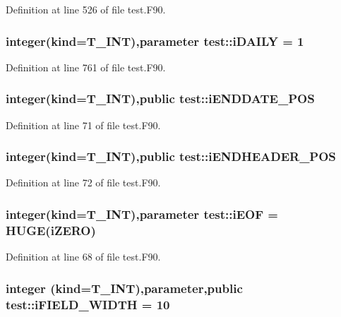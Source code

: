 Definition at line 526 of file test.F90.

\hypertarget{namespacetest_a48081398f90bec0222d878b534da1320}{
\subsubsection[{iDAILY}]{\setlength{\rightskip}{0pt plus 5cm}integer(kind={\bf T\_\-INT}),parameter {\bf test::iDAILY} = 1}}
\label{namespacetest_a48081398f90bec0222d878b534da1320}


Definition at line 761 of file test.F90.

\hypertarget{namespacetest_af29dc757927589439e32db648cb927b9}{
\subsubsection[{iENDDATE\_\-POS}]{\setlength{\rightskip}{0pt plus 5cm}integer(kind={\bf T\_\-INT}),public {\bf test::iENDDATE\_\-POS}}}
\label{namespacetest_af29dc757927589439e32db648cb927b9}


Definition at line 71 of file test.F90.

\hypertarget{namespacetest_ae27eee462dde556ad327a954598ee9de}{
\subsubsection[{iENDHEADER\_\-POS}]{\setlength{\rightskip}{0pt plus 5cm}integer(kind={\bf T\_\-INT}),public {\bf test::iENDHEADER\_\-POS}}}
\label{namespacetest_ae27eee462dde556ad327a954598ee9de}


Definition at line 72 of file test.F90.

\hypertarget{namespacetest_a3d9d5da4779988c8ab638ff80ee1d75e}{
\subsubsection[{iEOF}]{\setlength{\rightskip}{0pt plus 5cm}integer(kind={\bf T\_\-INT}),parameter {\bf test::iEOF} = HUGE({\bf iZERO})}}
\label{namespacetest_a3d9d5da4779988c8ab638ff80ee1d75e}


Definition at line 68 of file test.F90.

\hypertarget{namespacetest_a0255f32e18a217bf4bc1cc1ebf08a8ad}{
\subsubsection[{iFIELD\_\-WIDTH}]{\setlength{\rightskip}{0pt plus 5cm}integer (kind={\bf T\_\-INT}),parameter,public {\bf test::iFIELD\_\-WIDTH} = 10}}
\label{namespacetest_a0255f32e18a217bf4bc1cc1ebf08a8ad}


